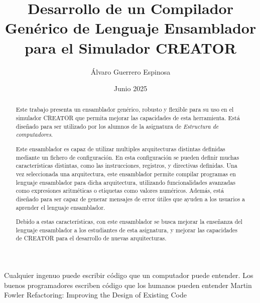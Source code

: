 \documentclass[es]{uc3mthesisIEEE}
\title{Desarrollo de un Compilador Genérico de Lenguaje Ensamblador para el Simulador CREATOR}
\author{Álvaro Guerrero Espinosa}
\date{Junio 2025}
\begin{document}
  \makecover


  \makeepigraph
    {Cualquier ingenuo puede escribir código que un computador puede entender. Los buenos programadores escriben código que los humanos pueden entender}  %
    {Martin Fowler}  %
    {Refactoring: Improving the Design of Existing Code}  %


  \begin{abstract}
    Este trabajo presenta un ensamblador genérico, robusto y flexible para su
    uso en el simulador CREATOR que permita mejorar las capacidades de esta
    herramienta. Está diseñado para ser utilizado por los alumnos de la
    asignatura de \textit{Estructura de computadores}.

    Este ensamblador es capaz de utilizar multiples arquitecturas distintas
    definidas mediante un fichero de configuración. En esta configuración se
    pueden definir muchas características distintas, como las instrucciones,
    registros, y directivas definidas. Una vez seleccionada una arquitectura,
    este ensamblador permite compilar programas en lenguaje ensamblador para
    dicha arquitectura, utilizando funcionalidades avanzadas como expresiones
    aritméticas o etiquetas como valores numéricos. Además, está diseñado para
    ser capaz de generar mensajes de error útiles que ayuden a los usuarios a
    aprender el lenguaje ensamblador.

    Debido a estas características, con este ensamblador se busca mejorar la
    enseñanza del lenguaje ensamblador a los estudiantes de esta asignatura, y
    mejorar las capacidades de CREATOR para el desarrollo de nuevas arquitecturas.

  \end{abstract}
\end{document}
